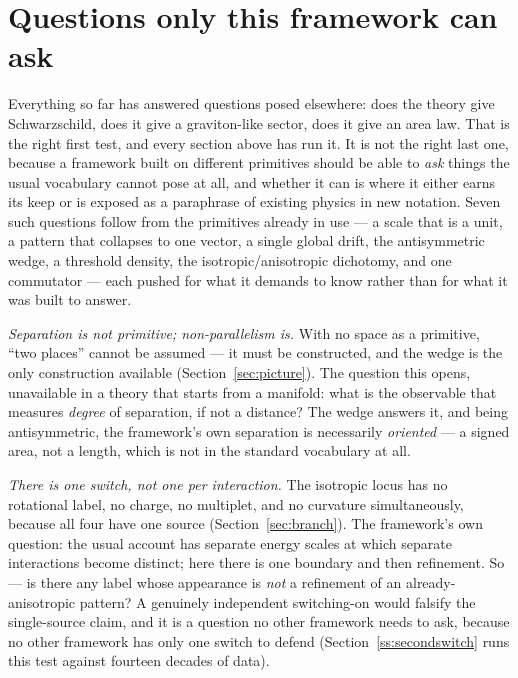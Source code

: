 \documentclass[aps,prd,twocolumn,superscriptaddress,nofootinbib]{revtex4-2}
\begin{document}
\section{Questions only this framework can ask}\label{ss:native}

Everything so far has answered questions posed elsewhere: does the
theory give Schwarzschild, does it give a graviton-like sector, does it
give an area law. That is the right first test, and every section above
has run it. It is not the right last one, because a framework built on
different primitives should be able to \emph{ask} things the usual
vocabulary cannot pose at all, and whether it can is where it either
earns its keep or is exposed as a paraphrase of existing physics in new
notation. Seven such questions follow from the primitives already in
use — a scale that is a unit, a pattern that collapses to one vector, a
single global drift, the antisymmetric wedge, a threshold density, the
isotropic/anisotropic dichotomy, and one commutator — each pushed for
what it demands to know rather than for what it was built to answer.

\emph{Separation is not primitive; non-parallelism is.} With no space as
a primitive, ``two places'' cannot be assumed — it must be constructed,
and the wedge is the only construction available (Section~\ref{sec:picture}).
The question this opens, unavailable in a theory that starts from a
manifold: what is the observable that measures \emph{degree} of
separation, if not a distance? The wedge answers it, and being
antisymmetric, the framework's own separation is necessarily
\emph{oriented} — a signed area, not a length, which is not in the
standard vocabulary at all.

\emph{There is one switch, not one per interaction.} The isotropic locus
has no rotational label, no charge, no multiplet, and no curvature
simultaneously, because all four have one source (Section~\ref{sec:branch}).
The framework's own question: the usual account has separate energy
scales at which separate interactions become distinct; here there is one
boundary and then refinement. So — is there any label whose appearance
is \emph{not} a refinement of an already-anisotropic pattern? A
genuinely independent switching-on would falsify the single-source claim,
and it is a question no other framework needs to ask, because no other
framework has only one switch to defend (Section~\ref{ss:secondswitch}
runs this test against fourteen decades of data).
\end{document}
